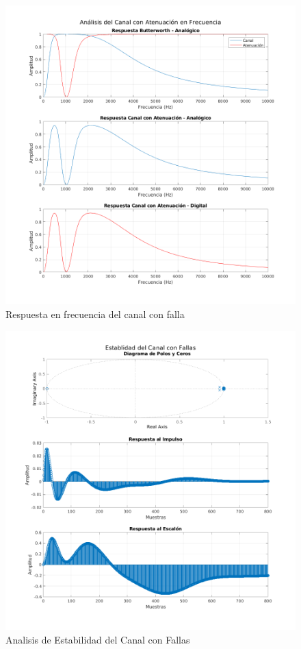 \begin{figure}[!htb]
  \centering
  \includegraphics[width=\linewidth]{images/simulacion/fallas/freq.png}
  \caption{Respuesta en frecuencia del canal con falla}
  \label{fig:falla_freq}
\end{figure}

\begin{figure}[!htb]
  \centering
  \includegraphics[width=\linewidth]{images/simulacion/fallas/chan.png}
  \caption{Analisis de Estabilidad del Canal con Fallas}
  \label{fig:falla_chan}
\end{figure}


